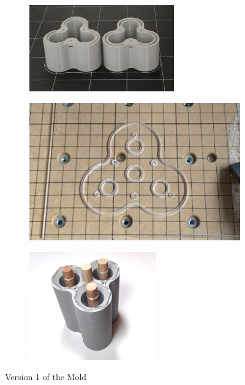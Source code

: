 \documentclass[twoside, 11pt]{article}
\begin{document}
\begin{figure}[H]
	\begin{subfigure}[b]{0.33\linewidth}
		\centering
		\includegraphics[width=\textwidth]{top_bottom_printed}
	\end{subfigure}%
	\begin{subfigure}[b]{0.33\linewidth}
		\centering		
		\includegraphics[width=\textwidth]{cover_plate_cnc}
	\end{subfigure}%
	\begin{subfigure}[b]{0.33\linewidth}
		\centering
		\includegraphics[width=0.6\textwidth]{assembled_v1}
	\end{subfigure}%
	\caption{Version 1 of the Mold}
\end{figure}
\end{document}
